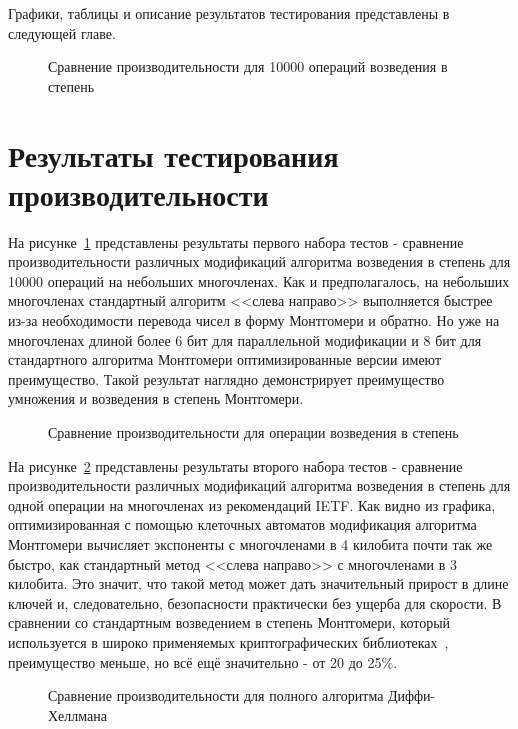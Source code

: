 \documentclass[times,specification,annotation]{itmo-student-thesis}
\begin{document}
Графики, таблицы и описание результатов тестирования представлены в следующей главе.

\begin{figure}[!b]
\caption{Сравнение производительности для 10000 операций возведения в степень}\label{fig:res}

\end{figure}

\section{Результаты тестирования производительности}\label{sec:results}

На рисунке~\ref{fig:res} представлены результаты первого набора тестов - сравнение производительности различных
модификаций алгоритма возведения в степень для 10000 операций на небольших многочленах.
Как и предполагалось, на небольших многочленах стандартный алгоритм <<слева направо>> выполняется быстрее из-за
необходимости перевода чисел в форму Монтгомери и обратно.
Но уже на многочленах длиной более 6 бит для параллельной модификации и 8 бит для стандартного алгоритма Монтгомери
оптимизированные версии имеют преимущество.
Такой результат наглядно демонстрирует преимущество умножения и возведения в степень Монтгомери.

\begin{figure}[!h]
\caption{Сравнение производительности для операции возведения в степень}\label{fig:res_bignum}

\end{figure}

На рисунке~\ref{fig:res_bignum} представлены результаты второго набора тестов - сравнение производительности различных
модификаций алгоритма возведения в степень для одной операции на многочленах из рекомендаций IETF.
Как видно из графика, оптимизированная с помощью клеточных автоматов модификация алгоритма Монтгомери
вычисляет экспоненты с многочленами в 4 килобита почти так же быстро, как стандартный метод <<слева направо>> с
многочленами в 3 килобита.
Это значит, что такой метод может дать значительный прирост в длине ключей и, следовательно, безопасности практически
без ущерба для скорости.
В сравнении со стандартным возведением в степень Монтгомери, который используется в широко применяемых
криптографических библиотеках~\cite{openssl}, преимущество меньше, но всё ещё значительно - от 20 до 25\%.

\begin{figure}[!h]
\caption{Сравнение производительности для полного алгоритма Диффи-Хеллмана}\label{fig:res_dhke}

\end{figure}
\end{document}
